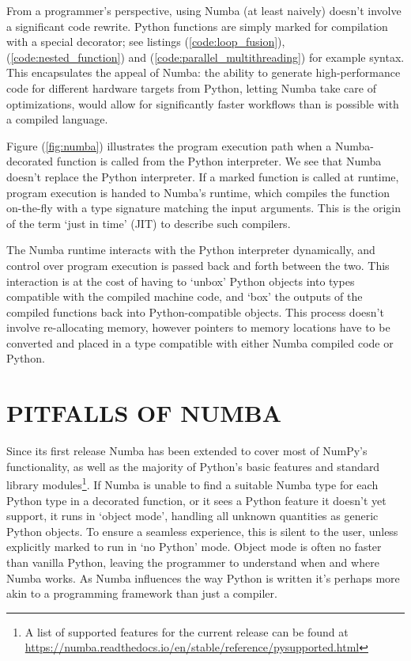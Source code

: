 \documentclass{IEEEcsmag}
\begin{document}
From a programmer's perspective, using Numba (at least naively) doesn't involve a significant code rewrite. Python functions are simply marked for compilation with a special decorator; see listings (\ref{code:loop_fusion}), (\ref{code:nested_function}) and (\ref{code:parallel_multithreading}) for example syntax. This encapsulates the appeal of Numba: the ability to generate high-performance code for different hardware targets from Python, letting Numba take care of optimizations, would allow for significantly faster workflows than is possible with a compiled language.

Figure (\ref{fig:numba}) illustrates the program execution path when a Numba-decorated function is called from the Python interpreter. We see that Numba doesn't replace the Python interpreter. If a marked function is called at runtime, program execution is handed to Numba's runtime, which compiles the function on-the-fly with a type signature matching the input arguments. This is the origin of the term `just in time' (JIT) to describe such compilers.

The Numba runtime interacts with the Python interpreter dynamically, and control over program execution is passed back and forth between the two. This interaction is at the cost of having to `unbox' Python objects into types compatible with the compiled machine code, and `box' the outputs of the compiled functions back into Python-compatible objects. This process doesn't involve re-allocating memory, however pointers to memory locations have to be converted and placed in a type compatible with either Numba compiled code or Python.



\section{PITFALLS OF NUMBA}\label{sec:pitfalls}

Since its first release Numba has been extended to cover most of NumPy's functionality, as well as the majority of Python's basic features and standard library modules\footnote{A list of supported features for the current release can be found at \url{https://numba.readthedocs.io/en/stable/reference/pysupported.html}}. If Numba is unable to find a suitable Numba type for each Python type in a decorated function, or it sees a Python feature it doesn't yet support, it runs in `object mode', handling all unknown quantities as generic Python objects. To ensure a seamless experience, this is silent to the user, unless explicitly marked to run in `no Python' mode. Object mode is often no faster than vanilla Python, leaving the programmer to understand when and where Numba works. As Numba influences the way Python is written it's perhaps more akin to a programming framework than just a compiler.
\end{document}
